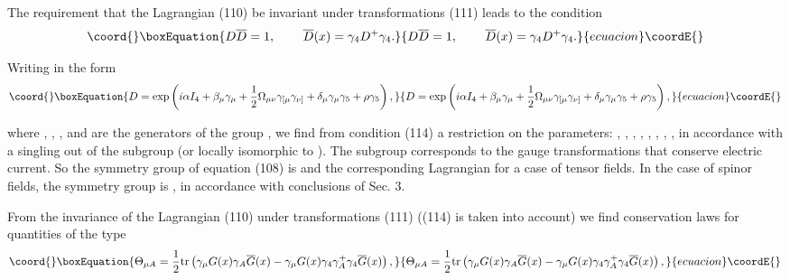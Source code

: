 \documentclass[a4paper,12pt]{article}
\begin{document}
The requirement that the Lagrangian (110) be invariant under
transformations (111) leads to the condition
\begin{equation}\coord{}\boxEquation{
D\overline{D}=1 ,\hspace{0.3in}\overline{D}(x)=\gamma
_4D^{+}\gamma _4  .\label{114}
}{
D\overline{D}=1 ,\hspace{0.3in}\overline{D}(x)=\gamma
_4D^{+}\gamma _4  .}{ecuacion}\coordE{}\end{equation}

Writing \coordHE{} in the form
\begin{equation}\coord{}\boxEquation{
D=\exp \left( i\alpha I_4+\beta _\mu \gamma _\mu +\frac 12\Omega
_{\mu \nu }\gamma _{[\mu }\gamma _{\nu ]}+\delta _\mu \gamma _\mu
\gamma _5+\rho \gamma _5\right) , \label{115}
}{
D=\exp \left( i\alpha I_4+\beta _\mu \gamma _\mu +\frac 12\Omega
_{\mu \nu }\gamma _{[\mu }\gamma _{\nu ]}+\delta _\mu \gamma _\mu
\gamma _5+\rho \gamma _5\right) , }{ecuacion}\coordE{}\end{equation}

where \coordHE{}, \myHighlight{$\gamma _\mu $}\coordHE{}, \myHighlight{$\frac 12\gamma _{[\mu }\gamma _{\nu
]}$}\coordHE{}, \coordHE{} and \coordHE{} are the generators
of the group \coordHE{}, we find from condition (114) a
restriction on the parameters: \myHighlight{$ \alpha ^{*}=\alpha $}\coordHE{}, \coordHE{}, \coordHE{}, \coordHE{}, \coordHE{}, \coordHE{}, \coordHE{}, \myHighlight{$\rho ^{*}=\rho $}\coordHE{},
in accordance with a singling out of the \coordHE{}
subgroup (or locally isomorphic to \coordHE{}). The subgroup \coordHE{}
corresponds to the gauge transformations that conserve electric
current. So the symmetry group of equation (108) is \coordHE{} and
the corresponding Lagrangian \myHighlight{$-$}\coordHE{}  \coordHE{} for a case
of tensor fields. In the case of spinor fields, the symmetry group
is \coordHE{}, in accordance with conclusions of Sec. 3.

From the invariance of the Lagrangian (110) under transformations
(111) ((114) is taken into account) we find conservation laws for
quantities of the type
\begin{equation}\coord{}\boxEquation{
\Theta _{\mu A}=\frac 12\mbox{tr}\left( \gamma _\mu G(x)\gamma
_A\overline{G} (x)-\gamma _\mu G(x)\gamma _4\gamma _A^{+}\gamma
_4\overline{G}(x)\right) ,\label{116}
}{
\Theta _{\mu A}=\frac 12\mbox{tr}\left( \gamma _\mu G(x)\gamma
_A\overline{G} (x)-\gamma _\mu G(x)\gamma _4\gamma _A^{+}\gamma
_4\overline{G}(x)\right) ,}{ecuacion}\coordE{}\end{equation}
\end{document}
